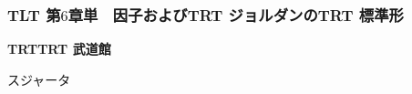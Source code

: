 \documentclass{beamer}
\begin{document}
\begin{frame}
    \frametitle{%
        {\textdir TLT
        第$6$章単　因子および{\textdir TRT ジョルダン}の{\textdir TRT 標準形}
        }
    }
    \begin{center}
    \Huge\bfseries\textdir TRT\pardir TRT
        {\hakusyu 武道館 }

        \bigskip

        {\color{red}\mulberry スジャータ }
    \end{center}
\end{frame}
\end{document}
